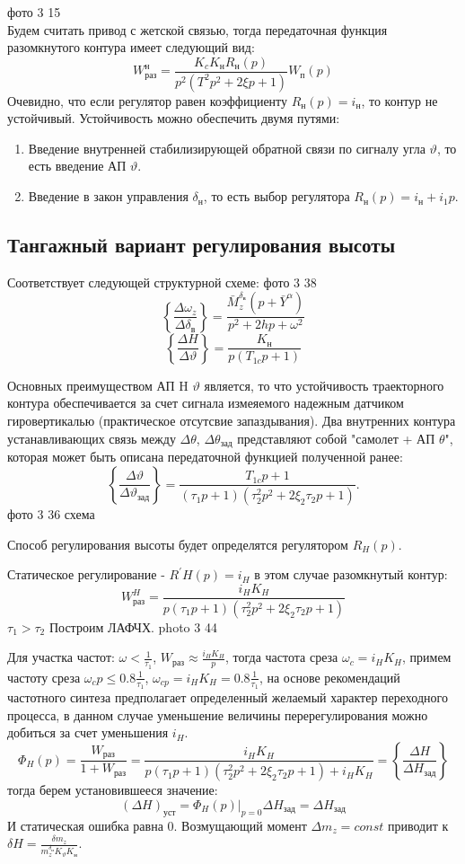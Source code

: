 \documentclass{article}
\begin{document}
фото 3 15\\
Будем считать привод с жетской связью, тогда передаточная функция разомкнутого контура имеет следующий вид:
\[
W_{раз}^н =\frac{K_c K_н R_н(p)}{p^2(T^2 p^2 + 2 \xi p + 1)}W_п(p)
\]
Очевидно, что если регулятор равен коэффициенту $R_н(p)  = i_н$, то контур не устойчивый.
Устойчивость можно обеспечить двумя путями:

\begin{enumerate}
\item Введение внутренней стабилизирующей обратной связи по сигналу угла $\vartheta$, то есть введение АП $\vartheta$.
\item Введение в закон управления $\delta_н$, то есть выбор регулятора $R_н(p) = i_н + i_1p$.
\end{enumerate}

\subsection{Тангажный вариант регулирования высоты}
Соответствует следующей структурной схеме:
фото 3 38
\[
    \left\{\frac{\Delta \omega_z}{\Delta \delta_в} \right\} = \frac{\bar{M}_z^{\delta_в}(p + \bar{Y}^\alpha)}{p^2 + 2hp + \omega^2} 
\]
\[
    \left\{ \frac{\Delta H}{\Delta \vartheta} \right\} = \frac{K_н}{p(T_{1c}p +1)}
\]

Основных преимуществом АП H $\vartheta$ является, то что устойчивость траекторного контура обеспечивается за счет сигнала измеяемого надежным датчиком гировертикалью (практическое отсутсвие запаздывания). Два внутренних контура устанавливающих связь между $\Delta \theta$, $\Delta \theta_{зад}$ представляют собой "самолет + АП $\theta$", которая может быть описана передаточной функцией полученной ранее:
\[
\left\{\frac{\Delta \vartheta}{\Delta \vartheta_{зад}} \right\} =\frac{T_{1c}p + 1}{(\tau_1 p + 1) (\tau_2^2p^2 + 2 \xi_2 \tau_2 p + 1)}.
\]
фото 3 36 схема 

Способ регулирования высоты будет определятся регулятором $R_H(p)$.

Статическое регулирование  - $R^{'}H(p) = i_H$ в этом случае разомкнутый контур:
\[
W_{раз}^H =\frac{i_H K_H}{p(\tau_1 p + 1)(\tau_2^2 p^2 + 2 \xi_2 \tau_2 p + 1)} 
\]
$\tau_1 > \tau_2$
Построим ЛАФЧХ. 
photo 3 44


Для участка частот:
$\omega < \frac{1}{\tau_1}$, $W_{раз} \approx \frac{i_H K_H }{p} $, тогда частота среза $\omega_c = i_H  K_H$, примем частоту среза $\omega_cp \le  0.8 \frac{1}{\tau_1}$, $\omega_{cp} = i_H K_H =0.8 \frac{1}{\tau_1} $, на основе рекомендаций частотного синтеза предполагает определенный желаемый характер переходного процесса, в данном случае уменьшение величины перерегулирования можно добиться за счет уменьшения $i_H$. 
\[
    \Phi_H (p) =\frac{W_{раз}}{1 + W_{раз}} =\frac{i_H K_H}{p(\tau_1 p +1)(\tau_2^2 p^2 + 2 \xi_2 \tau_2 p + 1) + i_H K_H} = \left\{ \frac{\Delta H}{\Delta H_{зад}} \right\}  
\]
тогда берем установившееся значение:
\[
(\Delta H)_{уст} = \Phi_H(p)|_{p=0} \Delta H_{зад} = \Delta H_{зад}
\]
И статическая ошибка равна 0. Возмущающий момент $\Delta m_z = const$ приводит к $\delta H =\frac{\delta m_z}{m_z^{\delta_н} K_\vartheta K_н}$.
\end{document}
